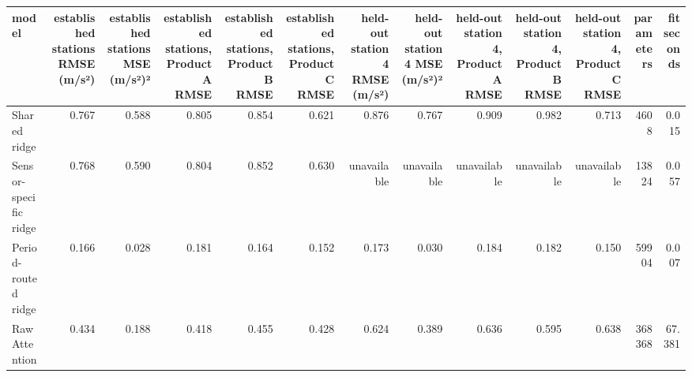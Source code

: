 \begin{tabular}{lrrrrrrrrrrrr}
\toprule
model & established stations RMSE (m/s²) & established stations MSE (m/s²)² & established stations, Product A RMSE & established stations, Product B RMSE & established stations, Product C RMSE & held-out station 4 RMSE (m/s²) & held-out station 4 MSE (m/s²)² & held-out station 4, Product A RMSE & held-out station 4, Product B RMSE & held-out station 4, Product C RMSE & parameters & fit seconds \\
\midrule
Shared ridge & 0.767 & 0.588 & 0.805 & 0.854 & 0.621 & 0.876 & 0.767 & 0.909 & 0.982 & 0.713 & 4608 & 0.015 \\
Sensor-specific ridge & 0.768 & 0.590 & 0.804 & 0.852 & 0.630 & unavailable & unavailable & unavailable & unavailable & unavailable & 13824 & 0.057 \\
Period-routed ridge & 0.166 & 0.028 & 0.181 & 0.164 & 0.152 & 0.173 & 0.030 & 0.184 & 0.182 & 0.150 & 59904 & 0.007 \\
Raw Attention & 0.434 & 0.188 & 0.418 & 0.455 & 0.428 & 0.624 & 0.389 & 0.636 & 0.595 & 0.638 & 368368 & 67.381 \\
\bottomrule
\end{tabular}

